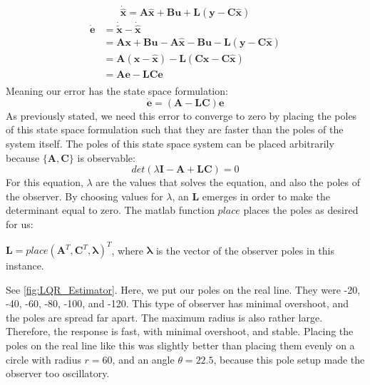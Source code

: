 \begin{equation*}
  \dot{\hat{\bm{x}}} = \bm{A}\hat{\bm{x}}+\bm{B}\bm{u} + \bm{L}(\bm{y}
  - \bm{C}\hat{\bm{x}})
\end{equation*}
\begin{align*}
  \dot{\bm{e}} &= \dot{\bm{\tilde{x}}} - \dot{\hat{\bm{x}}} \\
               &= \bm{Ax} + \bm{Bu} - \bm{A}\hat{\bm{x}} - \bm{Bu} - \bm{L}(\bm{y}- \bm{C}\hat{\bm{x}}) \\
               &= \bm{A}(\bm{x} - \hat{\bm{x}}) - \bm{L}(\bm{C}\bm{x}- \bm{C}\hat{\bm{x}}) \\
               &= \bm{Ae} - \bm{LCe} \\
\end{align*}
Meaning our error has the state space formulation:
\begin{equation}
  \dot{\bm{e}} = (\bm{A} - \bm{LC})\bm{e}
\end{equation}
As previously stated, we need this error to converge to zero by
placing the poles of this state space formulation such that they are
faster than the poles of the system itself. The poles of this state
space system can be placed arbitrarily because $\{\bm{A},\bm{C}\}$ is
observable:
\begin{equation*}
  det(\lambda\bm{I} - \bm{A} +\bm{LC}) = 0
\end{equation*}
For this equation, $\lambda$ are the values that solves the equation,
and also the poles of the observer. By choosing values for $\lambda$,
an $\bm{L}$ emerges in order to make the determinant equal to
zero. The matlab function $place$ places the poles as desired for us:

$\bm{L} = place(\bm{A}^T,\bm{C}^T,\bm{\lambda})^T$, where
$\bm{\lambda}$ is the vector of the observer poles in this instance.

See \cref{fig:LQR_Estimator}. Here, we put our poles on the real line. They were -20, -40, -60, -80, -100, and -120. This type of observer has minimal overshoot, and the poles are spread far apart. The maximum radius is also rather large. Therefore, the response is fast, with minimal overshoot, and stable. Placing the poles on the real line like this was slightly better than placing them evenly on a circle with radius $r = 60$, and an angle $\theta = 22.5$, because this pole setup made the observer too oscillatory.

